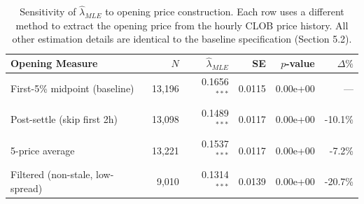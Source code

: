\begin{table}[H]
\centering
\small
\caption{Sensitivity of $\hat{\lambda}_{MLE}$ to opening price construction. Each row uses a different method to extract the opening price from the hourly CLOB price history. All other estimation details are identical to the baseline specification (Section 5.2).}
\label{tab:opening_robustness}
\begin{tabular}{lrrrrr}
\toprule
Opening Measure & $N$ & $\hat{\lambda}_{MLE}$ & SE & $p$-value & $\Delta\%$ \\
\midrule
First-5\% midpoint (baseline) & 13,196 & 0.1656$^{***}$ & 0.0115 & 0.00e+00 & --- \\
Post-settle (skip first 2h) & 13,098 & 0.1489$^{***}$ & 0.0117 & 0.00e+00 & -10.1\% \\
5-price average & 13,221 & 0.1537$^{***}$ & 0.0117 & 0.00e+00 & -7.2\% \\
Filtered (non-stale, low-spread) & 9,010 & 0.1314$^{***}$ & 0.0139 & 0.00e+00 & -20.7\% \\
\bottomrule
\end{tabular}
\end{table}